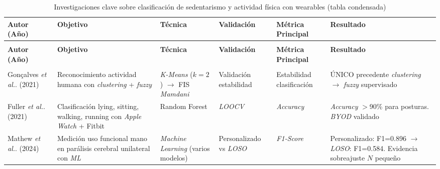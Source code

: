 \begin{xltabular}{\textwidth}{@{}>{\raggedright\arraybackslash}p{2.4cm}>{\raggedright\arraybackslash}X>{\raggedright\arraybackslash}p{3.0cm}>{\raggedright\arraybackslash}p{2.0cm}>{\raggedright\arraybackslash}p{2.2cm}>{\raggedright\arraybackslash}X@{}}
\caption{Investigaciones clave sobre clasificación de sedentarismo y actividad física con wearables (tabla condensada)}
\label{tab:comparativa_investigaciones_condensada} \\
\toprule
\textbf{Autor (Año)} & 
\textbf{Objetivo} & 
\textbf{Técnica} & 
\textbf{Validación} & 
\textbf{Métrica Principal} & 
\textbf{Resultado} \\
\midrule
\endfirsthead

 \\
\toprule
\textbf{Autor (Año)} & 
\textbf{Objetivo} & 
\textbf{Técnica} & 
\textbf{Validación} & 
\textbf{Métrica Principal} & 
\textbf{Resultado} \\
\midrule
\endhead

\midrule
{} \\
\endfoot

\bottomrule
\endlastfoot
        
        
        Gonçalves \textit{et al.}. (2021) \cite{Goncalves2021} & 
        Reconocimiento actividad humana con \textit{clustering} + \textit{fuzzy} & 
        \textit{K-Means} ($k=2$) $\rightarrow$ FIS \textit{Mamdani} & 
        Validación estabilidad & 
        Estabilidad clasificación & 
        ÚNICO precedente \textit{clustering} $\rightarrow$ \textit{fuzzy} supervisado \\
        
        \midrule
        
        Fuller \textit{et al.}. (2021) \cite{Fuller2021Predicting} & 
        Clasificación lying, sitting, walking, running con \textit{Apple Watch} + Fitbit & 
        Random Forest & 
        \textit{LOOCV} & 
        \textit{Accuracy} & 
        \textit{Accuracy} $>$90\% para posturas. \textit{BYOD} validado \\
        
        \midrule
        
        Mathew \textit{et al.}. (2024) \cite{Mathew2024LOSO} & 
        Medición uso funcional mano en parálisis cerebral unilateral con \textit{ML} & 
        \textit{Machine Learning} (varios modelos) & 
        Personalizado vs \textit{LOSO} & 
        \textit{F1-Score} & 
        Personalizado: F1=0.896 $\rightarrow$ \textit{LOSO}: F1=0.584. Evidencia sobreajuste $N$ pequeño \\
        

\end{xltabular}

